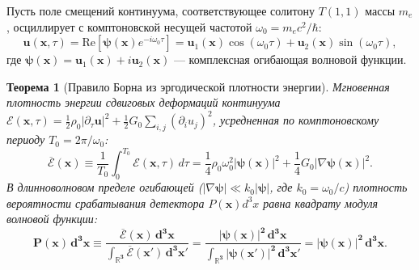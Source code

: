 \documentclass[11pt,a4paper,oneside]{article}
\theoremstyle{plain}
\newtheorem{theorem}{Теорема}[section]
\theoremstyle{definition}
\theoremstyle{remark}
\numberwithin{equation}{section}
\begin{document}
Пусть поле смещений континуума, соответствующее солитону $T(1,1)$ массы $m_e$, осциллирует с комптоновской несущей частотой $\omega_0 = m_e c^2 / \hbar$:
\begin{equation}
	\mathbf{u}(\mathbf{x}, \tau) = \text{Re}\left[ \boldsymbol{\psi}(\mathbf{x}) e^{-i \omega_0 \tau} \right] = \mathbf{u}_1(\mathbf{x}) \cos(\omega_0 \tau) + \mathbf{u}_2(\mathbf{x}) \sin(\omega_0 \tau),
\end{equation}
где $\boldsymbol{\psi}(\mathbf{x}) = \mathbf{u}_1(\mathbf{x}) + i \mathbf{u}_2(\mathbf{x})$ — комплексная огибающая волновой функции.

\begin{theorem}[Правило Борна из эргодической плотности энергии]
	Мгновенная плотность энергии сдвиговых деформаций континуума $\mathcal{E}(\mathbf{x}, \tau) = \frac{1}{2}\rho_0 |\partial_\tau \mathbf{u}|^2 + \frac{1}{2}G_0 \sum_{i,j}(\partial_i u_j)^2$, усредненная по комптоновскому периоду $T_0 = 2\pi / \omega_0$:
	\begin{equation}
		\overline{\mathcal{E}}(\mathbf{x}) \equiv \frac{1}{T_0} \int_0^{T_0} \mathcal{E}(\mathbf{x}, \tau) \, d\tau = \frac{1}{4} \rho_0 \omega_0^2 |\boldsymbol{\psi}(\mathbf{x})|^2 + \frac{1}{4} G_0 |\nabla \boldsymbol{\psi}(\mathbf{x})|^2.
	\end{equation}
	В длинноволновом пределе огибающей ($|\nabla \boldsymbol{\psi}| \ll k_0 |\boldsymbol{\psi}|$, где $k_0 = \omega_0/c$) плотность вероятности срабатывания детектора $P(\mathbf{x}) d^3x$ равна квадрату модуля волновой функции:
	\begin{equation}
		\mathbf{P(\mathbf{x}) \, d^3x \equiv \frac{\overline{\mathcal{E}}(\mathbf{x}) \, d^3x}{\int_{\mathbb{R}^3} \overline{\mathcal{E}}(\mathbf{x}') \, d^3x'} = \frac{|\boldsymbol{\psi}(\mathbf{x})|^2 \, d^3x}{\int_{\mathbb{R}^3} |\boldsymbol{\psi}(\mathbf{x}')|^2 \, d^3x'} = |\boldsymbol{\psi}(\mathbf{x})|^2 \, d^3x}.
	\label{eq:born_rule_derived}
\end{equation}
\end{theorem}
\end{document}
